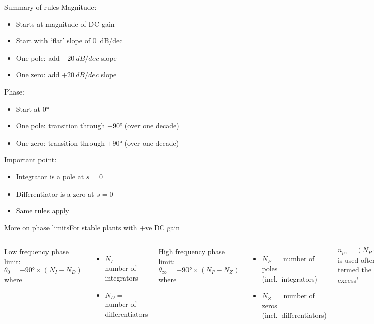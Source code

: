 \documentclass{beamer-control}
\begin{document}
\begin{frame}{Summary of rules}
  Magnitude:
  \begin{itemize}
    \item  Starts at magnitude of DC gain
    \item  Start with `flat' slope of \SI{0}{dB/dec}
    \item  One pole: add $-\SI{20}{dB/dec}$ slope
    \item  One zero: add $+\SI{20}{dB/dec}$ slope
  \end{itemize}
  Phase:
  \begin{itemize}
    \item  Start at \ang{0}
    \item  One pole: transition through $-\ang{90}$ (over one decade)
    \item  One zero: transition through $+\ang{90}$ (over one decade)
  \end{itemize}
  Important point:
  \begin{itemize}
    \item  Integrator is a pole at $s=0$
    \item  Differentiator is a zero at $s=0$
    \item  Same rules apply
  \end{itemize}
\end{frame}


\begin{frame}{More on phase limits}{For stable plants with +ve DC gain}
\begin{columns}[t]
\small
{}
Low frequency phase limit:
\[
\theta_0 = -\ang{90}\times(N_I-N_D)
\]
where
\begin{itemize}
\item $N_I =$ number of integrators
\item $N_D =$ number of differentiators
\end{itemize}

High frequency phase limit:
\[
\theta_\infty = -\ang{90}\times(N_P-N_Z)
\]
where
\begin{itemize}
\item $N_P =$ number of poles\\ (incl.\ integrators)
\item $N_Z =$ number of zeros\\ (incl.\ differentiators)
\end{itemize}
$n_{pe} = (N_P-N_Z)$ is used often and termed the `poles excess'


\end{columns}
\end{frame}
\end{document}
